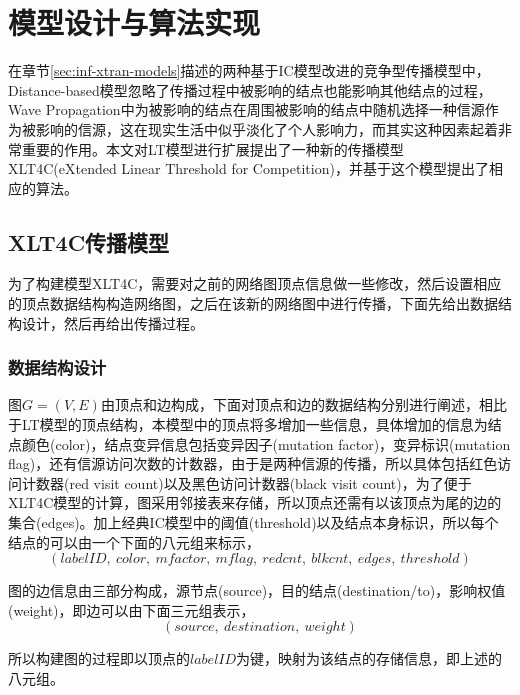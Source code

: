 \section{模型设计与算法实现}
在章节\ref{sec:inf-xtran-models}描述的两种基于IC模型改进的竞争型传播模型中，Distance-based模型忽略了传播过程中被影响的结点也能影响其他结点的过程，Wave Propagation中为被影响的结点在周围被影响的结点中随机选择一种信源作为被影响的信源，这在现实生活中似乎淡化了个人影响力，而其实这种因素起着非常重要的作用。本文对LT模型进行扩展提出了一种新的传播模型XLT4C(eXtended Linear Threshold for Competition)，并基于这个模型提出了相应的算法。


\subsection{XLT4C传播模型}
为了构建模型XLT4C，需要对之前的网络图顶点信息做一些修改，然后设置相应的顶点数据结构构造网络图，之后在该新的网络图中进行传播，下面先给出数据结构设计，然后再给出传播过程。

\subsubsection{数据结构设计}
\label{sec:xlt4c:ds-design}
图$G=(V,E)$由顶点和边构成，下面对顶点和边的数据结构分别进行阐述，相比于LT模型的顶点结构，本模型中的顶点将多增加一些信息，具体增加的信息为结点颜色(color)，结点变异信息包括变异因子(mutation factor)，变异标识(mutation flag)，还有信源访问次数的计数器，由于是两种信源的传播，所以具体包括红色访问计数器(red visit count)以及黑色访问计数器(black visit count)，为了便于XLT4C模型的计算，图采用邻接表来存储，所以顶点还需有以该顶点为尾的边的集合(edges)。加上经典IC模型中的阈值(threshold)以及结点本身标识，所以每个结点的可以由一个下面的八元组来标示，
\begin{displaymath}
(labelID, ~color, ~mfactor, ~mflag, ~redcnt, ~blkcnt, ~edges, ~threshold)
\end{displaymath}


图的边信息由三部分构成，源节点(source)，目的结点(destination/to)，影响权值(weight)，即边可以由下面三元组表示，
\begin{displaymath}
(source, ~destination, ~weight)
\end{displaymath}

所以构建图的过程即以顶点的$labelID$为键，映射为该结点的存储信息，即上述的八元组。

